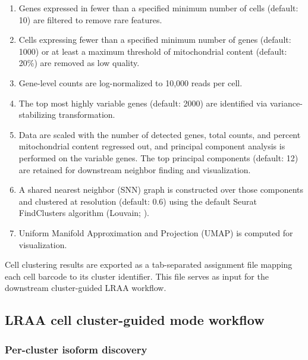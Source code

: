 \begin{enumerate}
\def\labelenumi{\arabic{enumi}.}
\item
  Genes expressed in fewer than a specified minimum number of cells (default: 10) are filtered to remove rare features.
\item
  Cells expressing fewer than a specified minimum number of genes (default: 1000) or at least a maximum threshold of mitochondrial content (default: 20\%) are removed as low quality.
\item
  Gene-level counts are log-normalized to 10,000 reads per cell.
\item
  The top most highly variable genes (default: 2000) are identified via variance-stabilizing transformation.
\item
  Data are scaled with the number of detected genes, total counts, and percent mitochondrial content regressed out, and principal component analysis is performed on the variable genes. The top principal components (default: 12) are retained for downstream neighbor finding and visualization.
\item
  A shared nearest neighbor (SNN) graph is constructed over those components and clustered at resolution (default: 0.6) using the default Seurat FindClusters algorithm (Louvain; \citealp{blondel2008}).
\item
  Uniform Manifold Approximation and Projection (UMAP) \citep{mcinnes2018} is computed for visualization.
\end{enumerate}

Cell clustering results are exported as a tab-separated assignment file mapping each cell barcode to its cluster identifier. This file serves as input for the downstream cluster-guided LRAA workflow.

\subsection{LRAA cell cluster-guided mode workflow}\label{lraa-cell-cluster-guided-mode-workflow}

\subsubsection{Per-cluster isoform discovery}\label{per-cluster-isoform-discovery}

